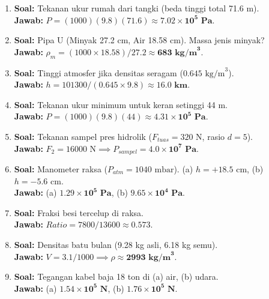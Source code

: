\documentclass{article}
\begin{document}
\begin{enumerate}[label=\textbf{\arabic*.}]
    \item \textbf{Soal:} Tekanan ukur rumah dari tangki (beda tinggi total 71.6 m). \\
    \textbf{Jawab:} $P = (1000)(9.8)(71.6) \approx \mathbf{7.02 \times 10^5 \text{ Pa}}$.

    \item \textbf{Soal:} Pipa U (Minyak 27.2 cm, Air 18.58 cm). Massa jenis minyak? \\
    \textbf{Jawab:} $\rho_m = (1000 \times 18.58)/27.2 \approx \mathbf{683 \text{ kg/m}^3}$.

    \item \textbf{Soal:} Tinggi atmosfer jika densitas seragam ($0.645 \text{ kg/m}^3$). \\
    \textbf{Jawab:} $h = 101300/(0.645 \times 9.8) \approx \mathbf{16.0 \text{ km}}$.

    \item \textbf{Soal:} Tekanan ukur minimum untuk keran setinggi 44 m. \\
    \textbf{Jawab:} $P = (1000)(9.8)(44) \approx \mathbf{4.31 \times 10^5 \text{ Pa}}$.

    \item \textbf{Soal:} Tekanan sampel pres hidrolik ($F_{tuas} = 320 \text{ N}$, rasio $d = 5$). \\
    \textbf{Jawab:} $F_2 = 16000 \text{ N} \implies P_{sampel} = \mathbf{4.0 \times 10^7 \text{ Pa}}$.

    \item \textbf{Soal:} Manometer raksa ($P_{atm} = 1040 \text{ mbar}$). (a) $h = +18.5 \text{ cm}$, (b) $h = -5.6 \text{ cm}$. \\
    \textbf{Jawab:} (a) $\mathbf{1.29 \times 10^5 \text{ Pa}}$, (b) $\mathbf{9.65 \times 10^4 \text{ Pa}}$.

    \item \textbf{Soal:} Fraksi besi tercelup di raksa. \\
    \textbf{Jawab:} $Ratio = 7800/13600 \approx \mathbf{0.573}$.

    \item \textbf{Soal:} Densitas batu bulan (9.28 kg asli, 6.18 kg semu). \\
    \textbf{Jawab:} $V = 3.1/1000 \implies \rho \approx \mathbf{2993 \text{ kg/m}^3}$.

    \item \textbf{Soal:} Tegangan kabel baja 18 ton di (a) air, (b) udara. \\
    \textbf{Jawab:} (a) $\mathbf{1.54 \times 10^5 \text{ N}}$, (b) $\mathbf{1.76 \times 10^5 \text{ N}}$.


\end{enumerate}
\end{document}
